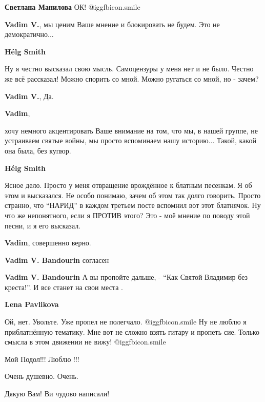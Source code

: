 \begin{itemize}
\begin{itemize}
\begin{itemize}
\textbf{Светлана Манилова} ОК!  @igg{fbicon.smile} 
\end{itemize} %

\textbf{Vadim V.}, мы ценим Ваше мнение и блокировать не будем. Это не демократично...

\begin{itemize} %
\textbf{Hélg Smith} 

Ну я честно высказал свою мысль. Самоцензуры у меня нет и не было. Честно же
всё рассказал! Можно спорить со мной. Можно ругаться со мной, но - зачем?


\textbf{Vadim V.}, Да.

\textbf{Vadim}, 

хочу немного акцентировать Ваше внимание на том, что мы, в нашей группе, не
устраиваем святые войны, мы просто вспоминаем нашу историю... Такой, какой она
была, без купюр.

\textbf{Hélg Smith} 

Ясное дело. Просто у меня отвращение врождённое к блатным песенкам. Я об этом и
высказался. Не особо понимаю, зачем об этом так долго говорить. Просто странно,
что \enquote{НАРИД} в каждом третьем посте вспомнил вот этот блатнячок. Ну что же
непонятного, если я ПРОТИВ этого? Это - моё мнение по поводу этой песни, и я
его высказал.

\textbf{Vadim}, совершенно верно.
\end{itemize} %

\textbf{Vadim V. Bandourin} согласен

\textbf{Vadim V. Bandourin} А вы пропойте дальше, - \enquote{Как Святой Владимир без креста!}. И все станет на свои места .

\textbf{Lena Pavlikova} 

Ой, нет. Увольте. Уже пропел не полегчало.  @igg{fbicon.smile}  Ну не люблю я приблатнённую
тематику. Мне вот не сложно взять гитару и пропеть сие. Только смысла в этом
движении не вижу!  @igg{fbicon.smile} 

\end{itemize} %

Мой Подол!!! Люблю !!!

Очень душевно. Очень.

Дякую Вам! Ви чудово написали!


\end{itemize}
